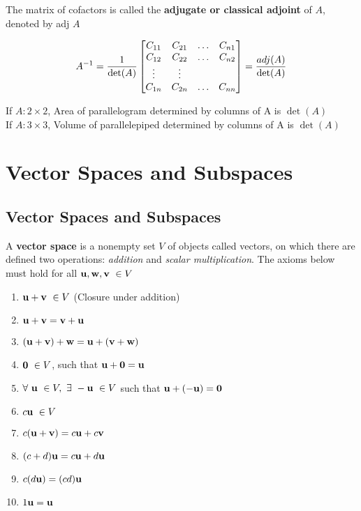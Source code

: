 \documentclass{report}
\begin{document}
The matrix of cofactors is called the \textbf{adjugate or classical adjoint} of $A$,
denoted by adj $A$

\begin{theorem}
    \[
    A^{-1} = \frac{1}{\det(A)}\begin{bmatrix}
        C_{11} & C_{21} &\ldots & C_{n1} \\
        C_{12} & C_{22} &\ldots & C_{n2} \\
        \vdots & \vdots & \\
        C_{1n} & C_{2n} &\ldots & C_{nn} \\
    \end{bmatrix} = \frac{adj(A)}{\det(A)}
    \] 
\end{theorem}

\begin{theorem}
    If $A: 2 \times 2$, Area of parallelogram determined by columns of A is $\det(A)$\\
    If $A: 3 \times 3$, Volume of parallelepiped determined by columns of A is $\det(A)$\\
\end{theorem}

\chapter{Vector Spaces and Subspaces}

\section{Vector Spaces and Subspaces}

\begin{definition}
    A \textbf{vector space} is a nonempty set $V$ of objects called vectors, on which there are defined two operations:
    \textit{addition} and \textit{scalar multiplication}. The axioms below must hold for all $\mathbf{u}, \mathbf{w}, \mathbf{v} \ \in V$
\end{definition}
\begin{tcolorbox}[colback=blue!5!white, colframe=blue!75!black]
\begin{enumerate}
    \item $\mathbf{u} + \mathbf{v} \ \in V$ (Closure under addition)
    \item $\mathbf{u} + \mathbf{v} = \mathbf{v} + \mathbf{u}$
    \item $(\mathbf{u} + \mathbf{v}) + \mathbf{w} = \mathbf{u} + (\mathbf{v} + \mathbf{w})$
    \item $\mathbf{0} \ \in V$, such that $\mathbf{u} + \mathbf{0} = \mathbf{u}$
    \item $\forall \ \uu \ \in V, \ \exists \ -\uu \ \in V$ such that $\mathbf{u} + (-\mathbf{u}) = \mathbf{0}$
    \item $c \mathbf{u} \ \in V$
    \item $c (\mathbf{u} + \mathbf{v}) = c \mathbf{u} + c \mathbf{v}$
    \item $(c + d) \mathbf{u} = c \mathbf{u} + d \mathbf{u}$
    \item $c (d \mathbf{u}) = (c d) \mathbf{u}$
    \item $1 \mathbf{u} = \mathbf{u}$
\end{enumerate}
\end{tcolorbox}
\end{document}
